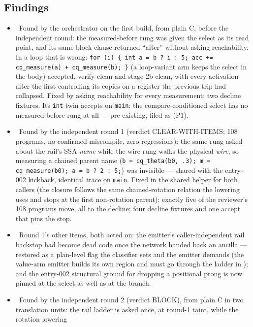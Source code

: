 \subsection*{Findings}
\begin{itemize}
  \item \fconfirmed\ Found by the orchestrator on the first build, from plain C, before the
    independent round: the measured-before rung was given the select as its read point, and its
    same-block clause returned ``after'' without asking reachability. In a loop that is wrong:
    \texttt{for (i) \{ int a = b ? i : 5; acc += cq\_measure(a) + cq\_measure(b); \}} (a loop-variant
    arm keeps the select in the body) accepted, verify-clean and stage-2b clean, with every
    activation after the first controlling its copies on a register the previous trip had collapsed.
    Fixed by asking reachability for every measurement; two decline fixtures. Its \texttt{int}
    twin accepts on \texttt{main}: the compare-conditioned select has no measured-before rung at all
    --- pre-existing, filed as  (P1).
  \item \fpreexisting\ Found by the independent round 1 (verdict CLEAR-WITH-ITEMS; 108 programs, no
    confirmed miscompile, zero regressions): the same rung asked about the rail's SSA \emph{name}
    while the wire rung walks the physical \emph{wire}, so measuring a chained parent name
    (\texttt{b = cq\_theta(b0, .3); m = cq\_measure(b0); a = b ? 2 : 5;}) was invisible --- shared
    with the entry-002 kickback, identical trace on \texttt{main}. Fixed in the shared helper for
    both callers (the closure follows the same chained-rotation relation the lowering uses and stops
    at the first non-rotation parent); exactly five of the reviewer's 108 programs move, all to the
    decline; four decline fixtures and one accept that pins the stop.
  \item \fdoc\ Round 1's other items, both acted on: the emitter's caller-independent rail backstop
    had become dead code once the network handed back an ancilla --- restored as a plan-level flag
    the classifier sets and the emitter demands (the value-arm emitter builds its own region and must
    go through the ladder in ); and the entry-002 structural ground for dropping a
    positional prong is now pinned at the select as well as at the branch.
  \item \fconfirmed\ Found by the independent round 2 (verdict BLOCK), from plain C in two
    translation units: the rail ladder is asked once, at round-1 taint, while the rotation lowering

\end{itemize}

